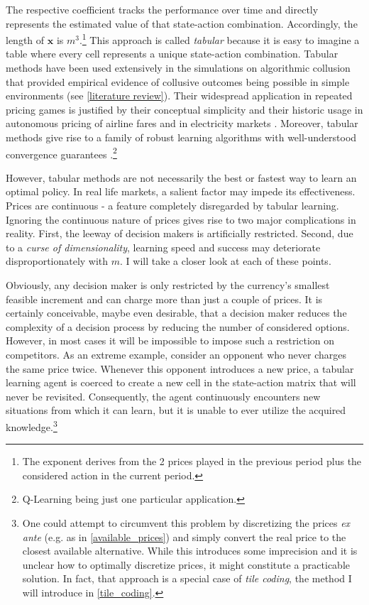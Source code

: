 The respective coefficient tracks the performance over time and directly represents the estimated value of that state-action combination. Accordingly, the length of $\boldsymbol{x}$ is $m^3$.\footnote{The exponent derives from the 2 prices played in the previous period plus the considered action in the current period.} This approach is called \emph{tabular} because it is easy to imagine a table where every cell represents a unique state-action combination. Tabular methods have been used extensively in the simulations on algorithmic collusion that provided empirical evidence of collusive outcomes being possible in simple environments (see \autoref{literature review}). Their widespread application in repeated pricing games is justified by their conceptual simplicity and their historic usage in autonomous pricing of airline fares and in electricity markets \parencite{ittoo_algorithmic_2017}. Moreover, tabular methods give rise to a family of robust learning algorithms with well-understood convergence guarantees \parencite{jaakkola_convergence_1994}.\footnote{Q-Learning being just one particular application.}

However, tabular methods are not necessarily the best or fastest way to learn an optimal policy. In real life markets, a salient factor may impede its effectiveness. Prices are continuous - a feature completely disregarded by tabular learning. Ignoring the continuous nature of prices gives rise to two major complications in reality. First, the leeway of decision makers is artificially restricted. Second, due to a \emph{curse of dimensionality}, learning speed and success may deteriorate disproportionately with $m$. I will take a closer look at each of these points.

Obviously, any decision maker is only restricted by the currency's smallest feasible increment and can charge more than just a couple of prices. It is certainly conceivable, maybe even desirable, that a decision maker reduces the complexity of a decision process by reducing the number of considered options. However, in most cases it will be impossible to impose such a restriction on competitors. As an extreme example, consider an opponent who never charges the same price twice. Whenever this opponent introduces a new price, a tabular learning agent is coerced to create a new cell in the state-action matrix that will never be revisited. Consequently, the agent continuously encounters new situations from which it can learn, but it is unable to ever utilize the acquired knowledge.\footnote{One could attempt to circumvent this problem by discretizing the prices \emph{ex ante} (e.g. as in \autoref{available_prices}) and simply convert the real price to the closest available alternative. While this introduces some imprecision and it is unclear how to optimally discretize prices, it might constitute a practicable solution. In fact, that approach is a special case of \emph{tile coding}, the method I will introduce in \autoref{tile_coding}.}

